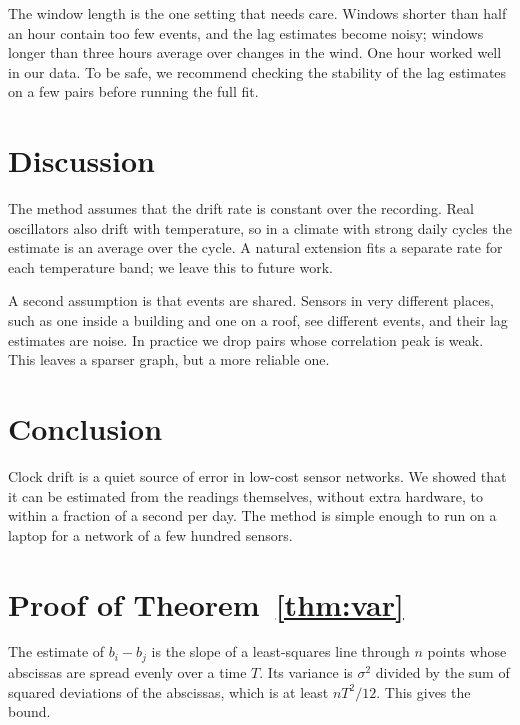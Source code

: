 \documentclass{article}
\begin{document}
The window length is the one setting that needs care. Windows shorter than
half an hour contain too few events, and the lag estimates become noisy;
windows longer than three hours average over changes in the wind. One hour
worked well in our data. To be safe, we recommend checking the stability of
the lag estimates on a few pairs before running the full fit.

\section{Discussion}

The method assumes that the drift rate is constant over the recording. Real
oscillators also drift with temperature, so in a climate with strong daily
cycles the estimate is an average over the cycle. A natural extension fits a
separate rate for each temperature band; we leave this to future work.

A second assumption is that events are shared. Sensors in very different
places, such as one inside a building and one on a roof, see different
events, and their lag estimates are noise. In practice we drop pairs whose
correlation peak is weak. This leaves a sparser graph, but a more reliable
one.

\section{Conclusion}

Clock drift is a quiet source of error in low-cost sensor networks. We
showed that it can be estimated from the readings themselves, without extra
hardware, to within a fraction of a second per day. The method is simple
enough to run on a laptop for a network of a few hundred sensors.




\appendix
\section{Proof of Theorem~\ref{thm:var}}\label{app:var}

The estimate of $b_i - b_j$ is the slope of a least-squares line through $n$
points whose abscissas are spread evenly over a time $T$. Its variance is
$\sigma^2$ divided by the sum of squared deviations of the abscissas, which
is at least $n T^2 / 12$. This gives the bound.
\end{document}
